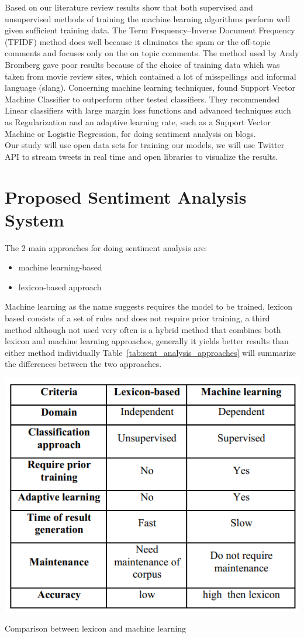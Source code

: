 Based on our literature review results show that both supervised and unsupervised methods of
training the machine learning algorithms perform well given sufficient training data. The Term Frequency–Inverse Document Frequency (TFIDF) method does well because it eliminates the
spam or the off-topic comments and focuses only on the on topic comments. The method used by
Andy Bromberg gave poor results because of the choice of training data which was taken from
movie review sites, which contained a lot of misspellings and informal language (slang).
Concerning machine learning techniques, \cite{ref41} found Support Vector
Machine Classifier to outperform other tested classifiers. They recommended Linear classifiers
with large margin loss functions and advanced techniques such as Regularization and an adaptive
learning rate, such as a Support Vector Machine or Logistic Regression, for doing sentiment
analysis on blogs.\\
Our study will use open data sets for training our models, we will use Twitter API to stream tweets in real time and open libraries to visualize the results.


\chapter{Proposed Sentiment Analysis System}

The 2  main approaches for doing sentiment analysis are: 
\begin{itemize}
\item machine learning-based
\item lexicon-based approach
\end{itemize}
%
Machine learning as the name suggests requires the model to be trained, lexicon based consists of a set of rules and does not require prior training, a third method although not used very often is a hybrid method that combines both lexicon and machine learning approaches, generally it yields better results than either method individually \cite{ref2}
%
Table~\ref{tab:sent_analysis_approaches} will summarize the differences between the two approaches.

\begin{table}[h]
  \centering
  \includegraphics[width=0.5\linewidth]{images/lex_vs_ml.png}
  \caption{Comparison between lexicon and machine learning}
  \label{tab:sent_analysis_approaches}
\end{table}

